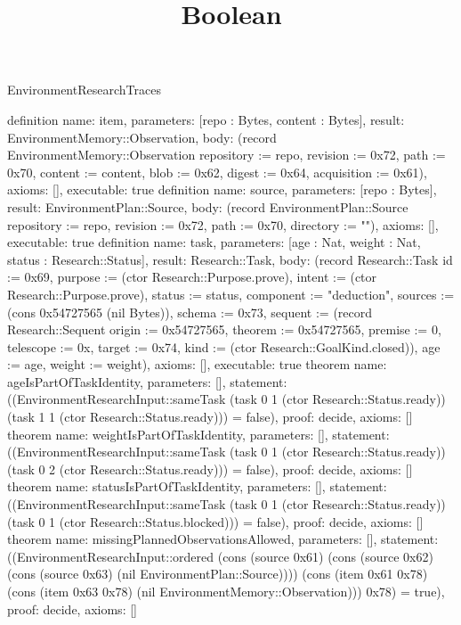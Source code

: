 \begin{lexlean}{EnvironmentResearchTraces}
\title{Boolean}
\begin{semanticmodule}
definition{
 name: item, parameters: [repo : Bytes, content : Bytes], result: EnvironmentMemory::Observation,
 body: (record EnvironmentMemory::Observation {repository := repo, revision := 0x72, path := 0x70, content := content, blob := 0x62, digest := 0x64, acquisition := 0x61}),
 axioms: [], executable: true
}
definition{
 name: source, parameters: [repo : Bytes], result: EnvironmentPlan::Source,
 body: (record EnvironmentPlan::Source {repository := repo, revision := 0x72, path := 0x70, directory := ""}),
 axioms: [], executable: true
}
definition{
 name: task, parameters: [age : Nat, weight : Nat, status : Research::Status], result: Research::Task,
 body: (record Research::Task {id := 0x69, purpose := (ctor Research::Purpose.prove), intent := (ctor Research::Purpose.prove), status := status, component := "deduction", sources := (cons 0x54727565 (nil Bytes)), schema := 0x73, sequent := (record Research::Sequent {origin := 0x54727565, theorem := 0x54727565, premise := 0, telescope := 0x, target := 0x74, kind := (ctor Research::GoalKind.closed)}), age := age, weight := weight}),
 axioms: [], executable: true
}
theorem{
 name: ageIsPartOfTaskIdentity, parameters: [],
 statement: ((EnvironmentResearchInput::sameTask (task 0 1 (ctor Research::Status.ready)) (task 1 1 (ctor Research::Status.ready))) = false), proof: decide{}, axioms: []
}
theorem{
 name: weightIsPartOfTaskIdentity, parameters: [],
 statement: ((EnvironmentResearchInput::sameTask (task 0 1 (ctor Research::Status.ready)) (task 0 2 (ctor Research::Status.ready))) = false), proof: decide{}, axioms: []
}
theorem{
 name: statusIsPartOfTaskIdentity, parameters: [],
 statement: ((EnvironmentResearchInput::sameTask (task 0 1 (ctor Research::Status.ready)) (task 0 1 (ctor Research::Status.blocked))) = false), proof: decide{}, axioms: []
}
theorem{
 name: missingPlannedObservationsAllowed, parameters: [],
 statement: ((EnvironmentResearchInput::ordered (cons (source 0x61) (cons (source 0x62) (cons (source 0x63) (nil EnvironmentPlan::Source)))) (cons (item 0x61 0x78) (cons (item 0x63 0x78) (nil EnvironmentMemory::Observation))) 0x78) = true), proof: decide{}, axioms: []
}
\end{semanticmodule}
\end{lexlean}
